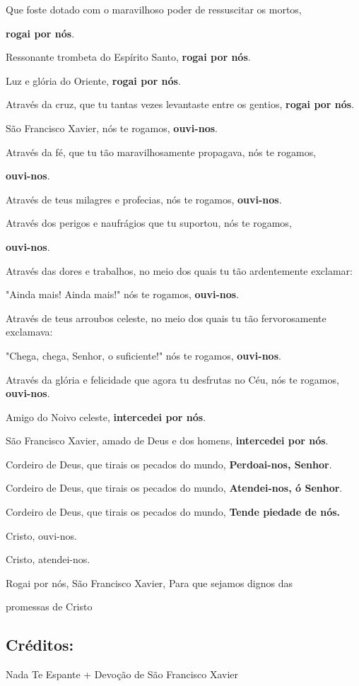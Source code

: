 \documentclass[11pt]{article}
\begin{document}
\begin{justify}
Que foste dotado com o maravilhoso poder de ressuscitar os mortos,

\textbf{rogai por nós}.

Ressonante trombeta do Espírito Santo, \textbf{rogai por nós}.

Luz e glória do Oriente, \textbf{rogai por nós}.

Através da cruz, que tu tantas vezes levantaste entre os gentios, \textbf{rogai por nós}.

São Francisco Xavier, nós te rogamos, \textbf{ouvi-nos}.

Através da fé, que tu tão maravilhosamente propagava, nós te rogamos,

\textbf{ouvi-nos}.

Através de teus milagres e profecias, nós te rogamos, \textbf{ouvi-nos}.

Através dos perigos e naufrágios que tu suportou, nós te rogamos,

\textbf{ouvi-nos}.

Através das dores e trabalhos, no meio dos quais tu tão ardentemente exclamar:

"Ainda mais! Ainda mais!" nós te rogamos, \textbf{ouvi-nos}.

Através de teus arroubos celeste, no meio dos quais tu tão fervorosamente exclamava:

"Chega, chega, Senhor, o suficiente!" nós te rogamos, \textbf{ouvi-nos}.

Através da glória e felicidade que agora tu desfrutas no Céu, nós te rogamos, \textbf{ouvi-nos}.

Amigo do Noivo celeste, \textbf{intercedei por nós}.

São Francisco Xavier, amado de Deus e dos homens, \textbf{intercedei por nós}.

Cordeiro de Deus, que tirais os pecados do mundo, \textbf{Perdoai-nos, Senhor}.

Cordeiro de Deus, que tirais os pecados do mundo, \textbf{Atendei-nos, ó Senhor}.

Cordeiro de Deus, que tirais os pecados do mundo, \textbf{Tende piedade de nós.}

Cristo, ouvi-nos.

Cristo, atendei-nos.

Rogai por nós, São Francisco Xavier, Para que sejamos dignos das

promessas de Cristo

\end{justify}

\subsection{Créditos:}
Nada Te Espante + Devoção de São Francisco Xavier
\end{document}
